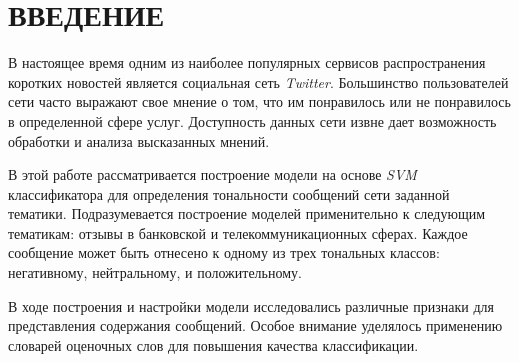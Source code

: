 \newpage
\part*{\large \centering ВВЕДЕНИЕ}

В настоящее время одним из наиболее популярных сервисов распространения коротких
новостей является социальная сеть {\it Twitter}.
Большинство пользователей сети часто выражают свое мнение о том, что им
понравилось или не понравилось в определенной сфере услуг.
Доступность данных сети извне дает возможность обработки и анализа
высказанных мнений.

В этой работе рассматривается построение модели на основе {\it SVM} классификатора для
определения тональности сообщений сети \twitter заданной тематики.
Подразумевается построение моделей применительно к следующим тематикам: отзывы в
банковской и телекоммуникационных сферах.
Каждое сообщение может быть отнесено к одному из трех тональных классов:
негативному, нейтральному, и положительному.

В ходе построения и настройки модели исследовались различные признаки для
представления содержания сообщений.
Особое внимание уделялось применению словарей оценочных слов для повышения
качества классификации.

\newpage
